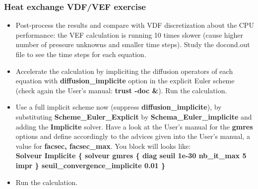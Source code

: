 \documentclass[10pt]{beamer}
\begin{document}
\begin{frame}
\frametitle{Heat exchange VDF/VEF exercise}
\begin{block}{}

\begin{itemize}
\item Post-process the results and compare with VDF discretization about the CPU performance: the VEF calculation is running 10 times slower (cause higher number of pressure unknowns and smaller time steps). Study the docond.out file to see the time steps for each equation.

\item Accelerate the calculation by impliciting the diffusion operators of each equation with \textbf{diffusion\_implicite} option in the explicit Euler scheme (check again the User's manual: \textbf{trust -doc \&}). Run the calculation.

\item \label{schema_impl} Use a full implicit scheme now (suppress \textbf{diffusion\_implicite}), by substituting \textbf{Scheme\_Euler\_Explicit} by \textbf{Schema\_Euler\_implicite} and adding the \textbf{Implicite} solver. Have a look at the User's manual for the \textbf{gmres} options and define accordingly to the advices given into the User's manual, a value for \textbf{facsec, facsec\_max}. You block will looks like:\\
\textbf{Solveur Implicite \{ solveur gmres \{ diag seuil 1e-30 nb\_it\_max 5 impr \}  seuil\_convergence\_implicite 0.01  \} }

\item Run the calculation.
\end{itemize}

\end{block}
\end{frame}
\end{document}
